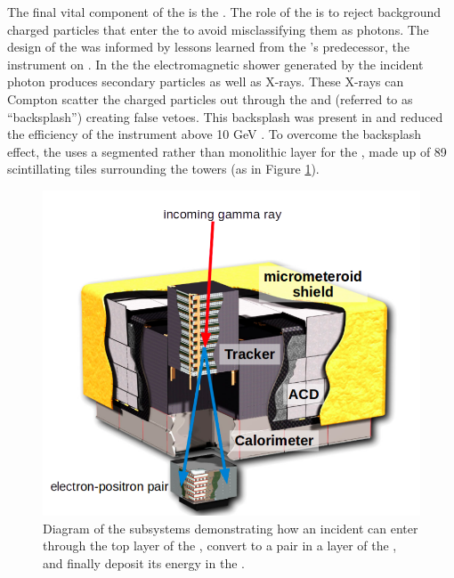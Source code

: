 The final vital component of the \lat{} is the \acd{}. The role of the \acd{} is to reject background charged particles that enter the \lat{} to avoid misclassifying them as photons. The design of the \acd{} was informed by lessons learned from the \lat{}'s predecessor, the \egret{} instrument on \cgro{} \citep{Mosieev05}. In the \calo{} the electromagnetic shower generated by the incident photon produces secondary particles as well as X-rays. These X-rays can Compton scatter the charged particles out through the 
\tkr{} and \acd{} (referred to as ``backsplash'') creating false vetoes. This backsplash was present in \egret{} and reduced the efficiency of the instrument above 10 GeV \cite{atwood09}. To overcome the backsplash effect, the \lat{} uses a segmented rather than monolithic layer for the \acd{}, made up of 89 scintillating tiles surrounding the towers (as in Figure \ref{fig:latGuts}).

\begin{figure}[ht!]
	\centering
	\includegraphics[width=1.0\columnwidth]{Figures/latGuts.png}
	\caption[Diagram of the three primary LAT subsystems]{Diagram of the \lat{} subsystems demonstrating how an incident \gam{} can enter through the top layer of the \acd{}, convert to a \ee{} pair in a layer of the \tkr{}, and finally deposit its energy in the \calo{}.}
	\label{fig:latGuts}
\end{figure}
 

